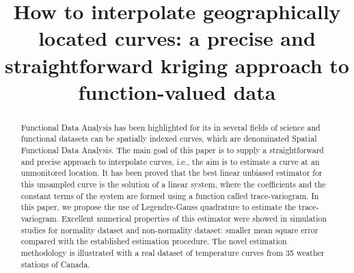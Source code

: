 \documentclass[12pt]{interact}
\theoremstyle{plain}%
\theoremstyle{definition}
\theoremstyle{remark}
\begin{document}

\title{How to interpolate geographically located curves: a precise and straightforward kriging approach to function-valued data}

\author{
}

\maketitle

\begin{abstract}
Functional Data Analysis has been highlighted for its in several fields of science and functional datasets can be spatially indexed curves, which are denominated Spatial Functional Data Analysis. The main goal of this paper is to supply a straightforward and precise approach to interpolate curves, i.e., the aim is to estimate a curve at an unmonitored location. It has been proved that the best linear unbiased estimator for this unsampled curve is the solution of a linear system, where the coefficients and the constant terms of the system are formed using a function called trace-variogram. In this paper, we propose the use of Legendre-Gauss quadrature to estimate the trace-variogram. Excellent numerical properties of this estimator were showed in simulation studies for normality dataset and non-normality dataset: smaller mean square error compared with the established estimation procedure. The novel estimation methodology is illustrated with a real dataset of temperature curves from 35 weather stations of Canada.
\end{abstract}
\end{document}
